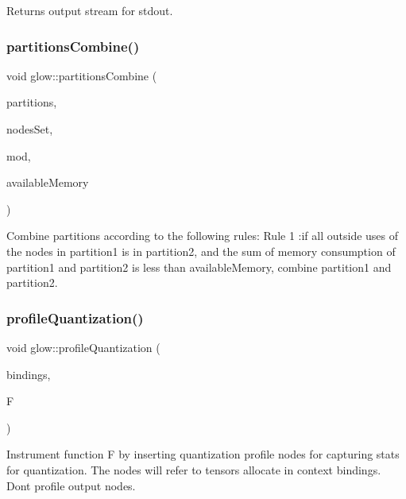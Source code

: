 \begin{DoxyReturn}{Returns}
output stream for stdout. 
\end{DoxyReturn}
\mbox{\label{namespaceglow_aab6afbd888776074c6bd9285aa3d9fd8}} 
\subsubsection{\texorpdfstring{partitions\+Combine()}{partitionsCombine()}}
{\footnotesize\ttfamily void glow\+::partitions\+Combine (\begin{DoxyParamCaption}\item[{\hyperlink{classglow_1_1_node_to_function_map}{Node\+To\+Function\+Map} \&}]{partitions,  }\item[{Function\+To\+Nodes\+Map \&}]{nodes\+Set,  }\item[{\hyperlink{classglow_1_1_module}{Module} $\ast$}]{mod,  }\item[{uint64\+\_\+t}]{available\+Memory }\end{DoxyParamCaption})}

Combine partitions according to the following rules\+: Rule 1 \+:if all outside uses of the nodes in partition1 is in partition2, and the sum of memory consumption of partition1 and partition2 is less than available\+Memory, combine partition1 and partition2. \mbox{\label{namespaceglow_a8e9d4a9dc79cc3c3010bc99e93b08fc7}} 
\subsubsection{\texorpdfstring{profile\+Quantization()}{profileQuantization()}}
{\footnotesize\ttfamily void glow\+::profile\+Quantization (\begin{DoxyParamCaption}\item[{\hyperlink{classglow_1_1_placeholder_bindings}{Placeholder\+Bindings} \&}]{bindings,  }\item[{\hyperlink{classglow_1_1_function}{Function} $\ast$}]{F }\end{DoxyParamCaption})}

Instrument function {\ttfamily F} by inserting quantization profile nodes for capturing stats for quantization. The nodes will refer to tensors allocate in context {\ttfamily bindings}. Don\textquotesingle{}t profile output nodes. \mbox{\label{namespaceglow_a1945e52546b506e9c6692b42e6ff78bd}} 
